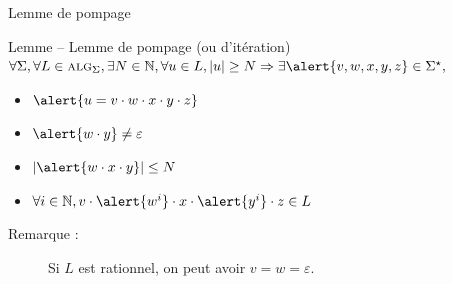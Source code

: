 \begin{frame}{Lemme de pompage}
  \vspace{-1mm}
  \begin{alertblock}{Lemme -- Lemme de pompage (ou d'itération)}
    \vspace{-1mm}
    $\forall\Sigma, \forall L\in \textsc{alg}_\Sigma, \exists N\in \mathbb{N}, \forall u\in L, |u| \ge N \Rightarrow \exists \alert{v, w, x, y, z}\in \Sigma^\star,$
    
    \vspace{1mm}
    \begin{minipage}{.4\textwidth}
      \begin{itemize}
      \item $\alert{u = v\cdot w\cdot x \cdot y \cdot z}$
      \item $\alert{w\cdot y} \neq \varepsilon$
      \end{itemize}
    \end{minipage}%
    \begin{minipage}{.5\textwidth}
      \begin{itemize}
      \item $|\alert{w\cdot x \cdot y}| \le N$
      \item $\forall i \in \mathbb{N}, v\cdot \alert{w^i} \cdot x \cdot \alert{y^i} \cdot z \in L$
      \end{itemize}
    \end{minipage}
  \end{alertblock}

  \begin{description}
  \item[Remarque :] Si $L$ est rationnel, on peut avoir $v = w = \varepsilon$.
  \end{description}


\end{frame}

\endgroup
\endinput
